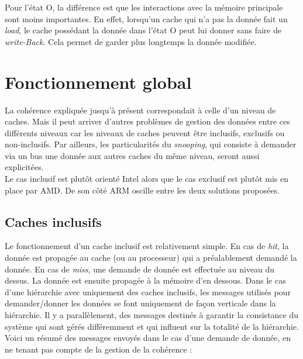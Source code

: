 Pour l'état O, la différence est que les interactions avec la mémoire principale sont moins importantes. En effet, lorsqu'un cache qui n'a pas la donnée fait un \textit{load}, le cache possédant la donnée dans l'état O peut lui donner sans faire de \textit{write-Back}. Cela permet de garder plus longtemps la donnée modifiée.

\section{Fonctionnement global}
La cohérence expliquée jusqu'à présent correspondait à celle d'un niveau de caches. Mais il peut arriver d'autres problèmes de gestion des données entre ces différents niveaux car les niveaux de caches peuvent être inclusifs, exclusifs ou non-inclusifs. Par ailleurs, les particularités du \emph{snooping}, qui consiste à demander via un bus une donnée aux autres caches du même niveau, seront aussi explicitées. \\

Le cas inclusif est plutôt orienté \textsf{Intel} alors que le cas exclusif est plutôt mis en place par \textsf{AMD}. De son côté \textsf{ARM} oscille entre les deux solutions proposées.

\label{inclusivite}
\subsection{Caches inclusifs}
Le fonctionnement d'un cache inclusif est relativement simple. En cas de \textit{hit}, la donnée est propagée au cache (ou au processeur) qui a préalablement demandé la donnée. En cas de \textit{miss}, une demande de donnée est effectuée au niveau du dessus. La donnée est ensuite propagée à la mémoire d'en dessous. Dans le cas d'une hiérarchie avec uniquement des caches inclusifs, les messages utilisés pour demander/donner les données se font uniquement de façon verticale dans la hiérarchie. Il y a parallèlement, des messages destinés à garantir la consistance du système qui sont gérés différemment et qui influent sur la totalité de la hiérarchie. Voici un résumé des messages envoyés dans le cas d'une demande de donnée, en ne tenant pas compte de la gestion de la cohérence : \\

